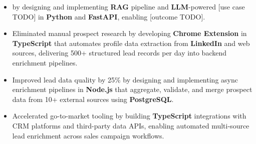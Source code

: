 %

\begin{itemize}[topsep=0pt]
  \item [Metric TODO] by designing and implementing \textbf{RAG} pipeline and \textbf{LLM}-powered [use case TODO] in \textbf{Python} and \textbf{FastAPI}, enabling [outcome TODO].
  \item Eliminated manual prospect research by developing \textbf{Chrome Extension} in \textbf{TypeScript} that automates profile data extraction from \textbf{LinkedIn} and web sources, delivering 500+ structured lead records per day into backend enrichment pipelines.
  \item Improved lead data quality by 25\% by designing and implementing async enrichment pipelines in \textbf{Node.js} that aggregate, validate, and merge prospect data from 10+ external sources using \textbf{PostgreSQL}.
  \item Accelerated go-to-market tooling by building \textbf{TypeScript} integrations with CRM platforms and third-party data APIs, enabling automated multi-source lead enrichment across sales campaign workflows.
\end{itemize}
